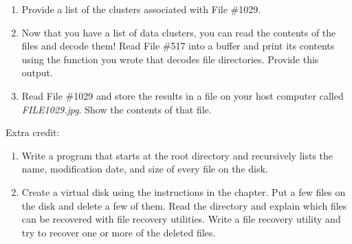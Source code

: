 \begin{enumerate}
  Recall that sectors on a FAT volume used to hold user data are
  called \emph{clusters};  each cluster may consist of one or
  more sectors (blocks). Each file can therefore be referred to by the
  number of the cluster where the first byte of file data is
  stored. The FAT array for each cluster contains a pointer to the
  location of the next cluster or a special value indicating there are
  no more data clusters. Each file is therefore described by a linked
  list of cluster numbers, and all of the linked lists for all of the
  files are stored within the fAT.

  For the remainder of this problem set we will be working with two
  files. File \#517 is the
  directory \verb|\DCIM\100CANON\| while File \#1029 is the JPEG image
  \verb|IMG_0001.JPG| in that directory.

  Once you have modified \texttt{mbrdecode.py} to read the entire FAT
  into memory, modify it further to print all of the cluster numbers 
  associated with File \#517. Provide a list of the clusters.

\item Provide a list of the clusters associated with File \#1029.

\item Now that you have a list of data clusters, you can read the
  contents of the files and decode them!  Read File \#517 into a
  buffer and print its contents using the function you wrote that
  decodes file directories. Provide this output.

\item Read File \#1029 and store the results in a file on your host
  computer called \emph{FILE1029.jpg}. Show the contents of that file.

\end{enumerate}
  
Extra credit:


\begin{enumerate}
\item Write a program that starts at the root
  directory and recursively lists the name, modification date, and
  size of every file on the disk.
\item Create a virtual disk using the instructions in the chapter. Put
  a few files on the disk and delete a few of them. Read the directory
  and explain which files can be recovered with file recovery
  utilities. Write a file recovery utility and try to recover one or
  more of the deleted files.
\end{enumerate}





